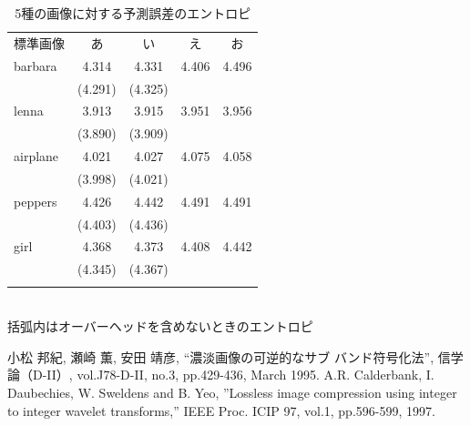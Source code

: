 \documentclass[9pt,dvipdfmx,uplatex]{jsarticle}
\begin{document}
\begin{table}[t]
\begin{center}
\caption{5種の画像に対する予測誤差のエントロピ}\label{TBL_AAA}
\begin{tabular}{lcccc}
\noalign{\hrule height 1pt}
標準画像 & あ & い & え &お\\
\noalign{\hrule height 1pt} 
barbara &4.314&4.331&4.406&4.496\\
        &(4.291)&(4.325)&\\\hline
lenna   &3.913&3.915&3.951&3.956\\
        &(3.890)&(3.909)\\\hline
airplane&4.021&4.027&4.075&4.058\\
        &(3.998)&(4.021)\\\hline
peppers &4.426&4.442&4.491&4.491\\
        &(4.403)&(4.436)\\\hline
girl    &4.368&4.373&4.408&4.442\\
        &(4.345)&(4.367)\\
\noalign{\hrule height 1pt}
\end{tabular}\\
括弧内はオーバーヘッドを含めないときのエントロピ
\end{center}
\end{table}


\begin{thebibliography}{99}
小松 邦紀, 瀬崎 薫, 安田 靖彦, ``濃淡画像の可逆的なサブ
バンド符号化法'', 信学論（D-II）, vol.J78-D-II, no.3,
pp.429-436, March 1995.
A.R. Calderbank, I. Daubechies, W. Sweldens and B. Yeo, ''Lossless
image compression using integer to integer wavelet transforms,'' 
IEEE Proc. ICIP 97, vol.1, pp.596-599, 1997.
\end{thebibliography}
\end{document}
